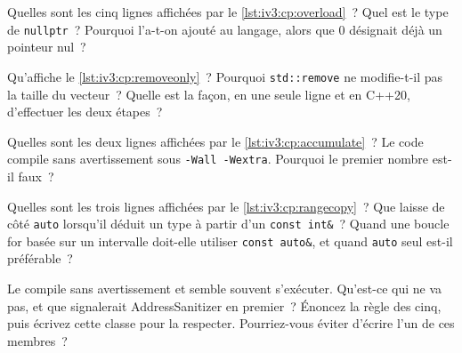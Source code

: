 \begin{question}\label{iq:iv3:cpp:9}
Quelles sont les cinq lignes affichées par le \cref{lst:iv3:cp:overload}~? Quel est le type de \texttt{nullptr}~? Pourquoi l'a-t-on ajouté au langage, alors que 0 désignait déjà un pointeur nul~?
\label{lst:iv3:cp:overload}
\end{question}

\begin{question}\label{iq:iv3:cpp:10}
Qu'affiche le \cref{lst:iv3:cp:removeonly}~? Pourquoi \texttt{std::remove} ne modifie-t-il pas la taille du vecteur~? Quelle est la façon, en une seule ligne et en C++20, d'effectuer les deux étapes~?
\label{lst:iv3:cp:removeonly}
\end{question}

\begin{question}\label{iq:iv3:cpp:11}
Quelles sont les deux lignes affichées par le \cref{lst:iv3:cp:accumulate}~? Le code compile sans avertissement sous \texttt{-Wall -Wextra}. Pourquoi le premier nombre est-il faux~?
\label{lst:iv3:cp:accumulate}
\end{question}

\begin{question}\label{iq:iv3:cpp:12}
Quelles sont les trois lignes affichées par le \cref{lst:iv3:cp:rangecopy}~? Que laisse de côté \texttt{auto} lorsqu'il déduit un type à partir d'un \texttt{const int\&}~? Quand une boucle for basée sur un intervalle doit-elle utiliser \texttt{const auto\&}, et quand \texttt{auto} seul est-il préférable~?
\label{lst:iv3:cp:rangecopy}
\end{question}

\begin{question}\label{iq:iv3:cpp:13}
Le  compile sans avertissement et semble souvent s'exécuter. Qu'est-ce qui ne va pas, et que signalerait AddressSanitizer en premier~? Énoncez la règle des cinq, puis écrivez cette classe pour la respecter. Pourriez-vous éviter d'écrire l'un de ces membres~?
\label{lst:iv3:cp:bufferbad}
\end{question}

